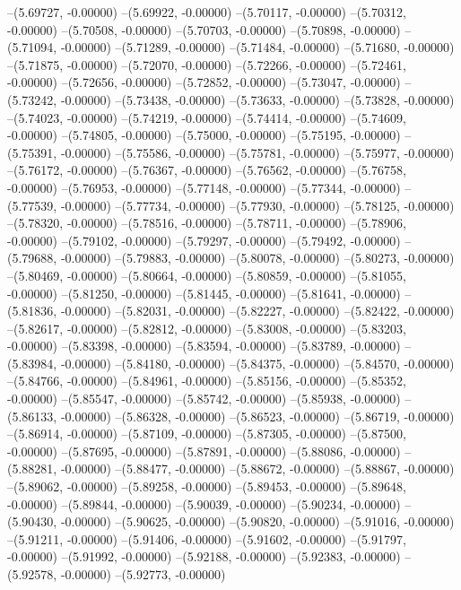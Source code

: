 --(5.69727, -0.00000)
--(5.69922, -0.00000)
--(5.70117, -0.00000)
--(5.70312, -0.00000)
--(5.70508, -0.00000)
--(5.70703, -0.00000)
--(5.70898, -0.00000)
--(5.71094, -0.00000)
--(5.71289, -0.00000)
--(5.71484, -0.00000)
--(5.71680, -0.00000)
--(5.71875, -0.00000)
--(5.72070, -0.00000)
--(5.72266, -0.00000)
--(5.72461, -0.00000)
--(5.72656, -0.00000)
--(5.72852, -0.00000)
--(5.73047, -0.00000)
--(5.73242, -0.00000)
--(5.73438, -0.00000)
--(5.73633, -0.00000)
--(5.73828, -0.00000)
--(5.74023, -0.00000)
--(5.74219, -0.00000)
--(5.74414, -0.00000)
--(5.74609, -0.00000)
--(5.74805, -0.00000)
--(5.75000, -0.00000)
--(5.75195, -0.00000)
--(5.75391, -0.00000)
--(5.75586, -0.00000)
--(5.75781, -0.00000)
--(5.75977, -0.00000)
--(5.76172, -0.00000)
--(5.76367, -0.00000)
--(5.76562, -0.00000)
--(5.76758, -0.00000)
--(5.76953, -0.00000)
--(5.77148, -0.00000)
--(5.77344, -0.00000)
--(5.77539, -0.00000)
--(5.77734, -0.00000)
--(5.77930, -0.00000)
--(5.78125, -0.00000)
--(5.78320, -0.00000)
--(5.78516, -0.00000)
--(5.78711, -0.00000)
--(5.78906, -0.00000)
--(5.79102, -0.00000)
--(5.79297, -0.00000)
--(5.79492, -0.00000)
--(5.79688, -0.00000)
--(5.79883, -0.00000)
--(5.80078, -0.00000)
--(5.80273, -0.00000)
--(5.80469, -0.00000)
--(5.80664, -0.00000)
--(5.80859, -0.00000)
--(5.81055, -0.00000)
--(5.81250, -0.00000)
--(5.81445, -0.00000)
--(5.81641, -0.00000)
--(5.81836, -0.00000)
--(5.82031, -0.00000)
--(5.82227, -0.00000)
--(5.82422, -0.00000)
--(5.82617, -0.00000)
--(5.82812, -0.00000)
--(5.83008, -0.00000)
--(5.83203, -0.00000)
--(5.83398, -0.00000)
--(5.83594, -0.00000)
--(5.83789, -0.00000)
--(5.83984, -0.00000)
--(5.84180, -0.00000)
--(5.84375, -0.00000)
--(5.84570, -0.00000)
--(5.84766, -0.00000)
--(5.84961, -0.00000)
--(5.85156, -0.00000)
--(5.85352, -0.00000)
--(5.85547, -0.00000)
--(5.85742, -0.00000)
--(5.85938, -0.00000)
--(5.86133, -0.00000)
--(5.86328, -0.00000)
--(5.86523, -0.00000)
--(5.86719, -0.00000)
--(5.86914, -0.00000)
--(5.87109, -0.00000)
--(5.87305, -0.00000)
--(5.87500, -0.00000)
--(5.87695, -0.00000)
--(5.87891, -0.00000)
--(5.88086, -0.00000)
--(5.88281, -0.00000)
--(5.88477, -0.00000)
--(5.88672, -0.00000)
--(5.88867, -0.00000)
--(5.89062, -0.00000)
--(5.89258, -0.00000)
--(5.89453, -0.00000)
--(5.89648, -0.00000)
--(5.89844, -0.00000)
--(5.90039, -0.00000)
--(5.90234, -0.00000)
--(5.90430, -0.00000)
--(5.90625, -0.00000)
--(5.90820, -0.00000)
--(5.91016, -0.00000)
--(5.91211, -0.00000)
--(5.91406, -0.00000)
--(5.91602, -0.00000)
--(5.91797, -0.00000)
--(5.91992, -0.00000)
--(5.92188, -0.00000)
--(5.92383, -0.00000)
--(5.92578, -0.00000)
--(5.92773, -0.00000)
